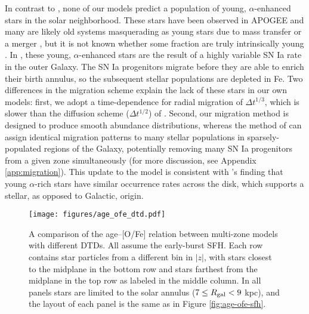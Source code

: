 \documentclass[twocolumn,twocolappendix,linenumbers]{aastex631}
\begin{document}
In contrast to , none of our models predict a population of young, $\alpha$-enhanced stars in the solar neighborhood. These stars have been observed in APOGEE \citep[e.g.,][]{Martig2016-CNAbundances,SilvaAguirre2018-YoungAlphaEnhanced} and many are likely old systems masquerading as young stars due to mass transfer or a merger \citep[e.g.,][]{Yong2016-YoungAlphaRich}, but it is not known whether some fraction are truly intrinsically young \citep{HekkerJohnson2019-YoungAlphaRich}. In , these young, $\alpha$-enhanced stars are the result of a highly variable SN Ia rate in the outer Galaxy. The SN Ia progenitors migrate before they are able to enrich their birth annulus, so the subsequent stellar populations are depleted in Fe. Two differences in the migration scheme explain the lack of these stars in our own models: first, we adopt a time-dependence for radial migration of $\Delta t^{1/3}$, which is slower than the diffusion scheme ($\Delta t^{1/2}$) of . Second, our migration method is designed to produce smooth abundance distributions, whereas the method of  can assign identical migration patterns to many stellar populations in sparsely-populated regions of the Galaxy, potentially removing many SN Ia progenitors from a given zone simultaneously (for more discussion, see Appendix \ref{app:migration}). This update to the model is consistent with \citeauthor{Grisoni2024-YoungAlphaRich}'s \citeyearpar{Grisoni2024-YoungAlphaRich} finding that young $\alpha$-rich stars have similar occurrence rates across the disk, which supports a stellar, as opposed to Galactic, origin.

\begin{figure*}
    \centering
    \texttt{[image: figures/age\_ofe\_dtd.pdf]}
    \caption{A comparison of the age--[O/Fe] relation between multi-zone models with different DTDs. All assume the early-burst SFH. Each row contains star particles from a different bin in $|z|$, with stars closest to the midplane in the bottom row and stars farthest from the midplane in the top row as labeled in the middle column. In all panels stars are limited to the solar annulus ($7\leq R_{\rm gal}<9$ kpc), and the layout of each panel is the same as in Figure \ref{fig:age-ofe-sfh}.}
    \label{fig:age-ofe-dtd}
\end{figure*}
\end{document}
